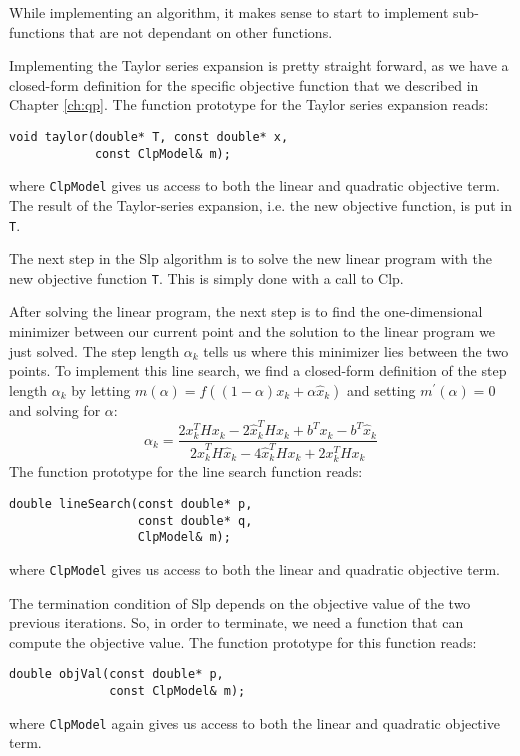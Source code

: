 While implementing an algorithm, it makes sense to start to implement
sub-functions that are not dependant on other functions. 

Implementing the Taylor series expansion is pretty straight forward, as
we have a closed-form definition for the specific objective function that
we described in Chapter \ref{ch:qp}. The function prototype for the
Taylor series expansion reads:
\begin{verbatim}
void taylor(double* T, const double* x,
            const ClpModel& m);
\end{verbatim}
where \texttt{ClpModel} gives us access to both the linear and quadratic
objective term. The result of the Taylor-series expansion, i.e. the new
objective function, is put in \texttt{T}.

The next step in the Slp algorithm is to solve the new linear program with the
new objective function \texttt{T}. This is simply done with a call to Clp.

After solving the linear program, the next step is to find the one-dimensional
minimizer between our current point and the solution to the linear program we
just solved.
The step length $\alpha_k$ tells us where this minimizer lies between the two
points.
To implement this line search, we find a closed-form definition of the step
length $\alpha_k$ by letting $m(\alpha) = f((1-\alpha) x_k + \alpha \hat{x}_k)$
and setting $m^\prime(\alpha) = 0$ and solving for $\alpha$:
\[
\alpha_k = \frac{
                2x_k^T H x_k
                - 2\hat{x}_k^T H x_k
                + b^T x_k - b^T \hat{x}_k
                }{
                  2\hat{x}_k^T H \hat{x}_k
                - 4\hat{x}_k^T H x_k
                + 2x_k^T H x_k
                }
\]
The function prototype for the line search function reads:
\begin{verbatim}
double lineSearch(const double* p,
                  const double* q,
                  ClpModel& m);
\end{verbatim}
where \texttt{ClpModel} gives us access to both the linear and quadratic
objective term.

The termination condition of Slp depends on the objective value of the two
previous iterations. So, in order to terminate, we need a function that can
compute the objective value. The function prototype for this function reads:
\begin{verbatim}
double objVal(const double* p,
              const ClpModel& m);
\end{verbatim}
where \texttt{ClpModel} again gives us access to both the linear and quadratic
objective term.


